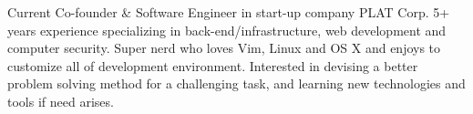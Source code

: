 

\begin{cvparagraph}

Current Co-founder \& Software Engineer in start-up company PLAT Corp. 5+ years experience specializing in back-end/infrastructure, web development and computer security. Super nerd who loves Vim, Linux and OS X and enjoys to customize all of development environment. Interested in devising a better problem solving method for a challenging task, and learning new technologies and tools if need arises.
\end{cvparagraph}
